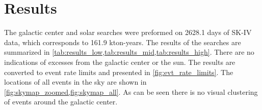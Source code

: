 \section{Results}
\label{sec:results}
The galactic center and solar searches were preformed on 2628.1 days of SK-IV data, which corresponds to 161.9 kton-years.  The results of the searches are summarized in \cref{tab:results_low,tab:results_mid,tab:results_high}.  There are no indications of excesses from the galactic center or the sun.  The results are converted to event rate limits and presented in \cref{fig:evt_rate_limits}.  The locations of all events in the sky are shown in \cref{fig:skymap_zoomed,fig:skymap_all}.  As can be seen there is no visual clustering of events around the galactic center.




	
